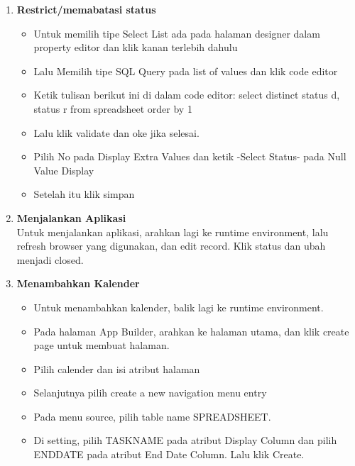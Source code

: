 \documentclass{article}
\begin{document}
\begin{enumerate}
\item \textbf{Restrict/memabatasi status}
\begin{itemize}
\item Untuk memilih tipe Select List ada pada halaman designer dalam property editor dan klik kanan terlebih dahulu
\item Lalu Memilih tipe SQL Query pada list of values dan klik code editor
\item Ketik tulisan berikut ini di dalam code editor: select distinct status d, status r from spreadsheet order by 1
\item Lalu klik validate dan oke jika selesai.
\item Pilih No pada Display Extra Values dan ketik -Select Status- pada Null Value Display
\item Setelah itu klik simpan\\
\end{itemize}
\item \textbf{Menjalankan Aplikasi}\\Untuk menjalankan aplikasi, arahkan lagi ke runtime environment, lalu refresh browser yang digunakan, dan edit record. Klik status dan ubah menjadi closed.\\

\item  \textbf{Menambahkan Kalender}
\begin{itemize}
\item  Untuk menambahkan kalender, balik lagi ke runtime environment.
\item Pada halaman App Builder, arahkan ke halaman utama, dan klik create page untuk membuat halaman.
\item Pilih calender dan isi atribut halaman
\item Selanjutnya pilih create a new navigation menu entry
\item Pada menu source, pilih table name SPREADSHEET.
\item Di setting, pilih TASKNAME pada atribut Display Column dan pilih ENDDATE pada atribut End Date Column. Lalu klik Create.\\
\end{itemize}



\end{enumerate}
\end{document}
